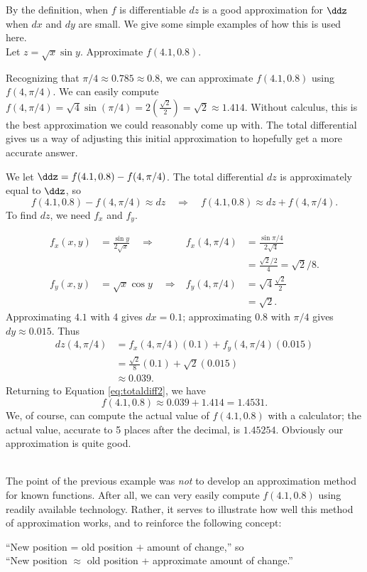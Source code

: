 By the definition, when $f$ is differentiable $dz$ is a good approximation for $\ddz$ when $dx$ and $dy$ are small. We give some simple examples of how this is used here.\\

{Let $z = \sqrt{x}\sin y$. Approximate $f(4.1,0.8)$.}
{Recognizing that $\pi/4 \approx 0.785\approx 0.8$, we can approximate $f(4.1,0.8)$ using $f(4,\pi/4)$. We can easily compute $f(4,\pi/4) = \sqrt{4}\sin(\pi/4) = 2\left(\frac{\sqrt{2}}2\right) = \sqrt{2}\approx 1.414.$ Without calculus, this is the best approximation we could reasonably come up with. The total differential gives us a way of adjusting this initial approximation to hopefully get a more accurate answer.

We let $\ddz = f(4.1,0.8) - f(4,\pi/4)$. The total differential $dz$ is approximately equal to $\ddz$, so
\begin{equation}f(4.1,0.8) - f(4,\pi/4) \approx dz \quad \Rightarrow \quad f(4.1,0.8) \approx dz + f(4,\pi/4).\label{eq:totaldiff2}\end{equation}
To find $dz$, we need $f_x$ and $f_y$.

\begin{align*}
f_x(x,y) &= \frac{\sin y}{2\sqrt{x}} \quad\Rightarrow&
f_x(4,\pi/4) &= \frac{\sin \pi/4}{2\sqrt{4}} \\
						& &&= \frac{\sqrt{2}/2}{4} = \sqrt{2}/8.\\
f_y(x,y) &= \sqrt{x}\cos y \quad\Rightarrow&
f_y(4,\pi/4) &= \sqrt{4}\frac{\sqrt{2}}2\\
		& & &= \sqrt{2}.
\end{align*}
Approximating $4.1$ with 4 gives $dx = 0.1$; approximating $0.8$ with $\pi/4$ gives $dy \approx 0.015$. Thus
\begin{align*}
dz(4,\pi/4) &=  f_x(4,\pi/4)(0.1) + f_y(4,\pi/4)(0.015)\\
				&= \frac{\sqrt{2}}8(0.1) + \sqrt{2}(0.015)\\
				&\approx 0.039.
\end{align*}
Returning to Equation \eqref{eq:totaldiff2}, we have
$$f(4.1,0.8) \approx 0.039 + 1.414 = 1.4531.$$
We, of course, can compute the actual value of $f(4.1,0.8)$ with a calculator; the actual value, accurate to 5 places after the decimal, is $1.45254$. Obviously our approximation is quite good.
}\\

The point of the previous example was \textit{not} to develop an approximation method for known functions. After all, we can very easily compute $f(4.1,0.8)$ using readily available technology. Rather, it serves to illustrate how well this method of approximation works, and to reinforce the following concept:
\begin{center}
	``New position = old position $+$ amount of change,'' so\\
	``New position $\approx$ old position + approximate amount of change.''
\end{center}


